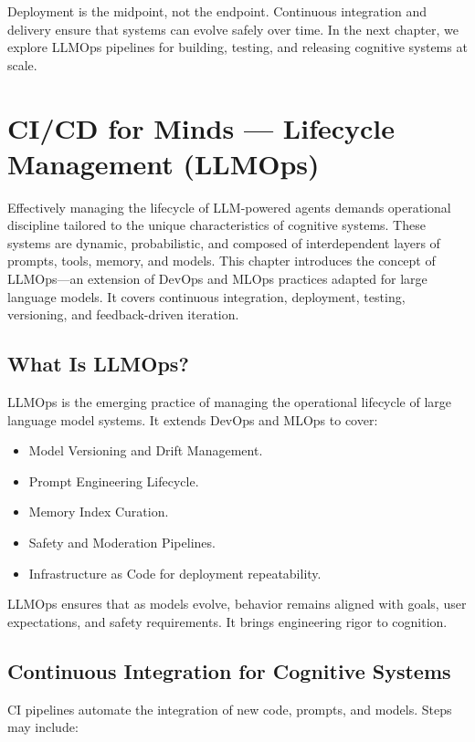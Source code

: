 \documentclass{book}
\begin{document}
Deployment is the midpoint, not the endpoint. Continuous integration and delivery ensure that systems can evolve safely over time. In the next chapter, we explore LLMOps pipelines for building, testing, and releasing cognitive systems at scale.

\chapter{CI/CD for Minds — Lifecycle Management (LLMOps)}

Effectively managing the lifecycle of LLM-powered agents demands operational discipline tailored to the unique characteristics of cognitive systems. These systems are dynamic, probabilistic, and composed of interdependent layers of prompts, tools, memory, and models. This chapter introduces the concept of LLMOps—an extension of DevOps and MLOps practices adapted for large language models. It covers continuous integration, deployment, testing, versioning, and feedback-driven iteration.

\section{What Is LLMOps?}

LLMOps is the emerging practice of managing the operational lifecycle of large language model systems. It extends DevOps and MLOps to cover:

\begin{itemize}
  \item Model Versioning and Drift Management.
  \item Prompt Engineering Lifecycle.
  \item Memory Index Curation.
  \item Safety and Moderation Pipelines.
  \item Infrastructure as Code for deployment repeatability.
\end{itemize}

LLMOps ensures that as models evolve, behavior remains aligned with goals, user expectations, and safety requirements. It brings engineering rigor to cognition.

\section{Continuous Integration for Cognitive Systems}

CI pipelines automate the integration of new code, prompts, and models. Steps may include:
\end{document}
